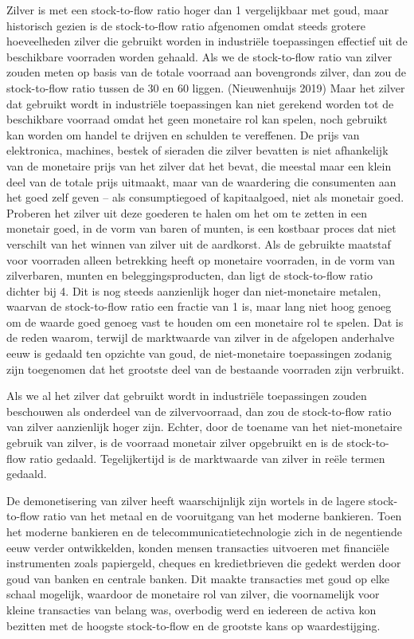 \documentclass[
  a5paper,
  smalldemyvopaper,11pt,twoside,onecolumn,openright,extrafontsizes,
hidelinks]{memoir}
\begin{document}
Zilver is met een stock-to-flow ratio hoger dan 1 vergelijkbaar met
goud, maar historisch gezien is de stock-to-flow ratio afgenomen omdat
steeds grotere hoeveelheden zilver die gebruikt worden in industriële
toepassingen effectief uit de beschikbare voorraden worden gehaald. Als
we de stock-to-flow ratio van zilver zouden meten op basis van de totale
voorraad aan bovengronds zilver, dan zou de stock-to-flow ratio tussen
de 30 en 60 liggen. (Nieuwenhuijs 2019) Maar het zilver dat gebruikt
wordt in industriële toepassingen kan niet gerekend worden tot de
beschikbare voorraad omdat het geen monetaire rol kan spelen, noch
gebruikt kan worden om handel te drijven en schulden te vereffenen. De
prijs van elektronica, machines, bestek of sieraden die zilver bevatten
is niet afhankelijk van de monetaire prijs van het zilver dat het bevat,
die meestal maar een klein deel van de totale prijs uitmaakt, maar van
de waardering die consumenten aan het goed zelf geven -- als
consumptiegoed of kapitaalgoed, niet als monetair goed. Proberen het
zilver uit deze goederen te halen om het om te zetten in een monetair
goed, in de vorm van baren of munten, is een kostbaar proces dat niet
verschilt van het winnen van zilver uit de aardkorst. Als de gebruikte
maatstaf voor voorraden alleen betrekking heeft op monetaire voorraden,
in de vorm van zilverbaren, munten en beleggingsproducten, dan ligt de
stock-to-flow ratio dichter bij 4. Dit is nog steeds aanzienlijk hoger
dan niet-monetaire metalen, waarvan de stock-to-flow ratio een fractie
van 1 is, maar lang niet hoog genoeg om de waarde goed genoeg vast te
houden om een monetaire rol te spelen. Dat is de reden waarom, terwijl
de marktwaarde van zilver in de afgelopen anderhalve eeuw is gedaald ten
opzichte van goud, de niet-monetaire toepassingen zodanig zijn
toegenomen dat het grootste deel van de bestaande voorraden zijn
verbruikt.

Als we al het zilver dat gebruikt wordt in industriële toepassingen
zouden beschouwen als onderdeel van de zilvervoorraad, dan zou de
stock-to-flow ratio van zilver aanzienlijk hoger zijn. Echter, door de
toename van het niet-monetaire gebruik van zilver, is de voorraad
monetair zilver opgebruikt en is de stock-to-flow ratio gedaald.
Tegelijkertijd is de marktwaarde van zilver in reële termen gedaald.

De demonetisering van zilver heeft waarschijnlijk zijn wortels in de
lagere stock-to-flow ratio van het metaal en de vooruitgang van het
moderne bankieren. Toen het moderne bankieren en de
telecommunicatietechnologie zich in de negentiende eeuw verder
ontwikkelden, konden mensen transacties uitvoeren met financiële
instrumenten zoals papiergeld, cheques en kredietbrieven die gedekt
werden door goud van banken en centrale banken. Dit maakte transacties
met goud op elke schaal mogelijk, waardoor de monetaire rol van zilver,
die voornamelijk voor kleine transacties van belang was, overbodig werd
en iedereen de activa kon bezitten met de hoogste stock-to-flow en de
grootste kans op waardestijging.
\end{document}
